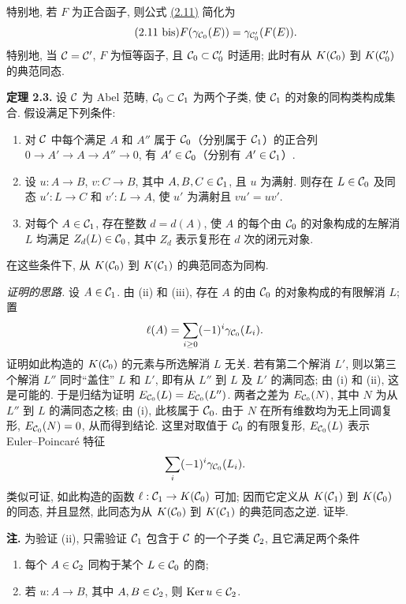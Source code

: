 特别地, 若 $F$ 为正合函子, 则公式 \hyperlink{sga6.e00.eq.2-11}{(2.11)} 简化为
\begin{equation}\tag{2.11 bis}
 F(\gamma_{\mathcal C_0}(E))=\gamma_{\mathcal C'_0}(F(E)).
\end{equation}
特别地, 当 $\mathcal C=\mathcal C'$, $F$ 为恒等函子, 且 $\mathcal C_0\subset \mathcal C'_0$ 时适用; 此时有从 $K(\mathcal C_0)$ 到 $K(\mathcal C'_0)$ 的典范同态.

\textbf{定理 2.3.} 设 $\mathcal C$ 为 Abel 范畴, $\mathcal C_0\subset \mathcal C_1$ 为两个子类, 使 $\mathcal C_1$ 的对象的同构类构成集合. 假设满足下列条件:

\begin{enumerate}[label=(\roman*)]
\item 对 $\mathcal C$ 中每个满足 $A$ 和 $A''$ 属于 $\mathcal C_0$（分别属于 $\mathcal C_1$）的正合列 $0\to A'\to A\to A''\to 0$, 有 $A'\in\mathcal C_0$（分别有 $A'\in\mathcal C_1$）.
\item 设 $u:A\to B$, $v:C\to B$, 其中 $A,B,C\in\mathcal C_1$, 且 $u$ 为满射. 则存在 $L\in\mathcal C_0$ 及同态 $u':L\to C$ 和 $v':L\to A$, 使 $u'$ 为满射且 $vu'=uv'$.
\item 对每个 $A\in\mathcal C_1$, 存在整数 $d=d(A)$, 使 $A$ 的每个由 $\mathcal C_0$ 的对象构成的左解消 $L$ 均满足 $Z_d(L)\in\mathcal C_0$, 其中 $Z_d$ 表示复形在 $d$ 次的闭元对象.
\end{enumerate}
在这些条件下, 从 $K(\mathcal C_0)$ 到 $K(\mathcal C_1)$ 的典范同态为同构.

\emph{证明的思路.} 设 $A\in\mathcal C_1$. 由 (ii) 和 (iii), 存在 $A$ 的由 $\mathcal C_0$ 的对象构成的有限解消 $L$; 置
\[
 \ell(A)=\sum_{i\geq 0}(-1)^i\gamma_{\mathcal C_0}(L_i).
\]
证明如此构造的 $K(\mathcal C_0)$ 的元素与所选解消 $L$ 无关. 若有第二个解消 $L'$, 则以第三个解消 $L''$ 同时“盖住” $L$ 和 $L'$, 即有从 $L''$ 到 $L$ 及 $L'$ 的满同态; 由 (i) 和 (ii), 这是可能的. 于是归结为证明 $E_{\mathcal C_0}(L)=E_{\mathcal C_0}(L'')$. 两者之差为 $E_{\mathcal C_0}(N)$, 其中 $N$ 为从 $L''$ 到 $L$ 的满同态之核; 由 (i), 此核属于 $\mathcal C_0$. 由于 $N$ 在所有维数均为无上同调复形, $E_{\mathcal C_0}(N)=0$, 从而得到结论. 这里对取值于 $\mathcal C_0$ 的有限复形, $E_{\mathcal C_0}(L)$ 表示 Euler--Poincar\'e 特征
\[
 \sum_i (-1)^i\gamma_{\mathcal C_0}(L_i).
\]
类似可证, 如此构造的函数 $\ell:\mathcal C_1\to K(\mathcal C_0)$ 可加; 因而它定义从 $K(\mathcal C_1)$ 到 $K(\mathcal C_0)$ 的同态, 并且显然, 此同态为从 $K(\mathcal C_0)$ 到 $K(\mathcal C_1)$ 的典范同态之逆. 证毕.

\textbf{注.} 为验证 (ii), 只需验证 $\mathcal C_1$ 包含于 $\mathcal C$ 的一个子类 $\mathcal C_2$, 且它满足两个条件
\begin{enumerate}[label=(ii \alph*)]
\item 每个 $A\in\mathcal C_2$ 同构于某个 $L\in\mathcal C_0$ 的商;
\item 若 $u:A\to B$, 其中 $A,B\in\mathcal C_2$, 则 $\operatorname{Ker} u\in\mathcal C_2$.
\end{enumerate}

